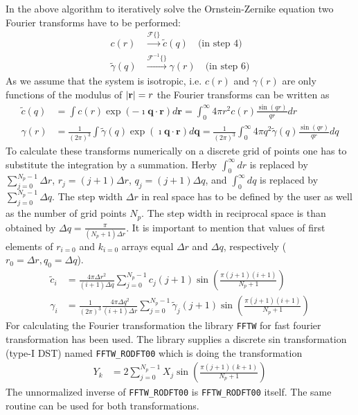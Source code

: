 In the above algorithm to iteratively solve the Ornstein-Zernike
equation two Fourier transforms have to be performed:
\begin{align}
c(r) & \xrightarrow{\mathscr{F}\{\}} \tilde{c}(q)  \quad \mbox{(in step 4)} \\
\tilde{\gamma}(q) & \xrightarrow{\mathscr{F}^{-1}\{\}} \gamma(r) \quad \mbox{(in step 6)}
\end{align}
As we assume that the system is isotropic, i.e. $c(r)$ and $\gamma(r)$ are only functions
of the modulus of $\abs{\mathbf{r}}=r$ the Fourier transforms can be written as
\begin{align}
\tilde{c}(q) &= \int c(r) \exp\left(- \imath\mathbf{q}\cdot \mathbf{r} \right) d\mathbf{r}
              = \int_0^\infty 4\pi r^2 c(r)              \frac{\sin(qr)}{qr}  dr \\
\gamma(r)    &= \frac{1}{(2\pi)^3}
                \int \tilde{\gamma}(q) \exp\left(\imath\mathbf{q}\cdot \mathbf{r}\right) d\mathbf{q}
              = \frac{1}{(2\pi)^3}
                \int_0^\infty 4\pi q^2 \tilde{\gamma}(q) \frac{\sin(qr)}{qr}  dq
\end{align}
To calculate these transforms numerically on a discrete grid of points
one has to substitute the integration by a summation. Herby $\int_0^\infty dr$ is replaced by
$\sum_{j=0}^{N_p-1} \Delta r$, $r_j=(j+1)\Delta r$, $q_j=(j+1)\Delta q$, and $\int_0^\infty dq$ is replaced by
$\sum_{j=0}^{N_p-1} \Delta q$. The step width $\Delta r$ in real space has to be defined by the user as well
as the number of grid points $N_p$. The step width in reciprocal space is than obtained by
$\Delta q=\frac{\pi}{(N_p+1)\Delta r}$.
It is important to mention that values of first elements of $r_{i=0}$ and $k_{i=0}$ arrays equal $\Delta r$
and $\Delta q$, respectively ($r_0=\Delta r, q_0=\Delta q$).
\begin{align}
\tilde{c}_i &=                   \frac{4\pi \Delta r^2}{(i+1)\Delta q} \sum_{j=0}^{N_p-1}              c_j (j+1) \sin\left(\frac{\pi(j+1)(i+1)}{N_p+1}\right) \\
\gamma_i    &= \frac{1}{(2\pi)^3}\frac{4\pi \Delta q^2}{(i+1)\Delta r} \sum_{j=0}^{N_p-1} \tilde{\gamma}_j (j+1) \sin\left(\frac{\pi(j+1)(i+1)}{N_p+1}\right)
\end{align}
For calculating the Fourier transformation the library \texttt{FFTW} for fast fourier transformation
\cite{FFTW05,FFTW97} has been used. The library supplies a discrete sin transformation (type-I DST)
named \verb"FFTW_RODFT00" which is doing the transformation
\begin{align}
Y_k &= 2 \sum_{j=0}^{N_p-1} X_j \sin\left(\frac{\pi(j + 1)(k + 1)}{N_p + 1}\right)
\end{align}
The unnormalized inverse of \verb"FFTW_RODFT00" is \verb"FFTW_RODFT00" itself.
The same routine can be used for both transformations.

